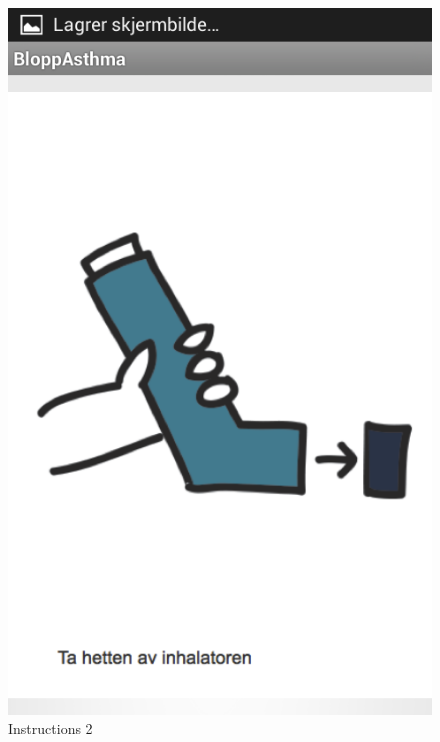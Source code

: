 \begin{figure}
\begin{minipage}[b]{0.3\linewidth}
		\includegraphics[width=0.20\paperwidth]{Pictures/app-screenshots/instructions-2.png}
		\caption{Instructions 2}
		\label{fig:instructions-2}
	\end{minipage}
	\begin{minipage}[b]{0.3\linewidth}
		\centering

\end{minipage}
\end{figure}
